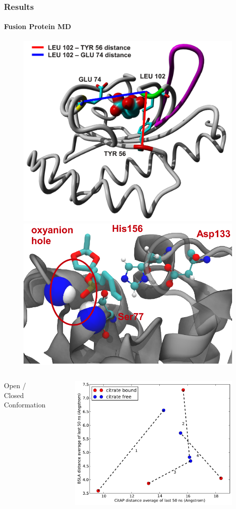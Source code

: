 \documentclass[english]{beamer}
\begin{document}
\begin{frame}
    \frametitle{Results}
    \framesubtitle{Fusion Protein MD}  

    \vspace{0.94\topmargin}

    \begin{figure}
        \hspace{0.1\textwidth}
        \includegraphics[width=.3\linewidth]{figures/CitA_pocket2.pdf}
        \includegraphics[width=.3\textwidth]{figures/BSLA_pocket/BSLA_pocket_cartoon.pdf}
    \end{figure}     

    \vspace{-0.5cm} 

    \vfill

    \begin{columns}[]
        \vfill
        \centering
        Open / Closed Conformation
        \begin{figure}
            \includegraphics[width=\textwidth]{figures/CitAP_BSLA_distance/BSLA_CitAP_analyzed_with_average_of_last_50_ns.pdf}  
        \end{figure}         


\end{columns}
\end{frame}
\end{document}
